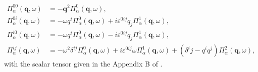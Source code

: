 \documentclass[bachelor,english,numbers]{ustcthesis}
\begin{document}
		\begin{subequations}
		\begin{align}
			\Pi_\alpha^{00}(\bm{q},\omega)&=-\bm{q}^2\Pi^0_\alpha(\bm{q},\omega),\label{2.4.9a}\\
			\Pi_\alpha^{0i}(\bm{q},\omega)&=-\omega q^i\Pi^0_\alpha(\bm{q},\omega)+i \varepsilon^{0ij}q_j\Pi^1_\alpha(\bm{q},\omega),\label{2.4.9b}\\
			\Pi_\alpha^{i0}(\bm{q},\omega)&=-\omega q^i\Pi^0_\alpha(\bm{q},\omega)-i \varepsilon^{0ij}q_j\Pi^1_\alpha(\bm{q},\omega),\label{2.4.9c}\\
			\Pi_\alpha^{ij}(\bm{q},\omega)&=-\omega^2\delta^{ij}\Pi^0_\alpha(\bm{q},\omega)+i \varepsilon^{0ij}\omega\Pi^1_\alpha(\bm{q},\omega)+(\delta^ij-q^iq^j)\Pi^2_\alpha(\bm{q},\omega),\label{2.4.9d}
		\end{align}
		\end{subequations}
		with the scalar tensor given in the Appendix B of \cite{lopez1991fractional}.
\end{document}
